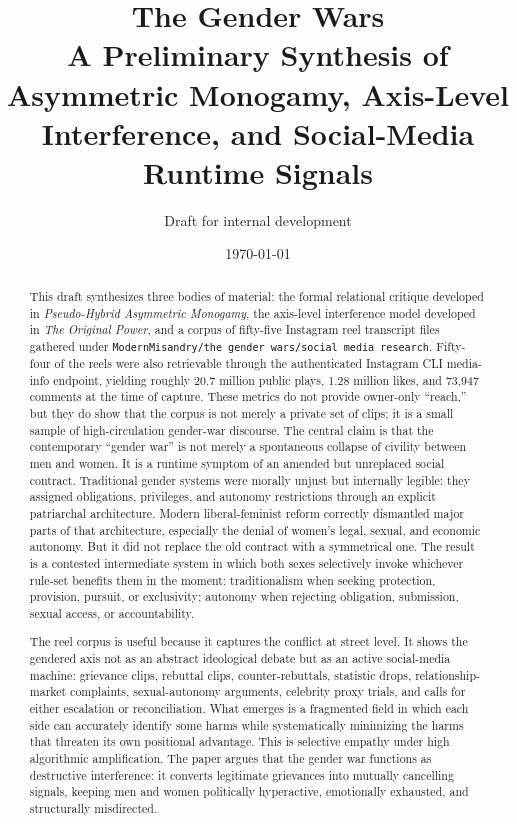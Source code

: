 \documentclass[12pt]{article}
\title{\textbf{The Gender Wars}\\
\large A Preliminary Synthesis of Asymmetric Monogamy, Axis-Level Interference, and Social-Media Runtime Signals}
\author{Draft for internal development}
\date{\today}
\newcommand{\OP}{\textit{The Original Power}}
\newcommand{\PHAM}{\textit{Pseudo-Hybrid Asymmetric Monogamy}}
\newcommand{\CorpusPath}{\texttt{ModernMisandry/the gender wars/social media research}}
\begin{document}
\maketitle

\begin{abstract}
This draft synthesizes three bodies of material: the formal relational critique developed in \PHAM, the axis-level interference model developed in \OP, and a corpus of fifty-five Instagram reel transcript files gathered under \CorpusPath. Fifty-four of the reels were also retrievable through the authenticated Instagram CLI media-info endpoint, yielding roughly 20.7 million public plays, 1.28 million likes, and 73,947 comments at the time of capture. These metrics do not provide owner-only ``reach,'' but they do show that the corpus is not merely a private set of clips; it is a small sample of high-circulation gender-war discourse. The central claim is that the contemporary ``gender war'' is not merely a spontaneous collapse of civility between men and women. It is a runtime symptom of an amended but unreplaced social contract. Traditional gender systems were morally unjust but internally legible: they assigned obligations, privileges, and autonomy restrictions through an explicit patriarchal architecture. Modern liberal-feminist reform correctly dismantled major parts of that architecture, especially the denial of women's legal, sexual, and economic autonomy. But it did not replace the old contract with a symmetrical one. The result is a contested intermediate system in which both sexes selectively invoke whichever rule-set benefits them in the moment: traditionalism when seeking protection, provision, pursuit, or exclusivity; autonomy when rejecting obligation, submission, sexual access, or accountability.

The reel corpus is useful because it captures the conflict at street level. It shows the gendered axis not as an abstract ideological debate but as an active social-media machine: grievance clips, rebuttal clips, counter-rebuttals, statistic drops, relationship-market complaints, sexual-autonomy arguments, celebrity proxy trials, and calls for either escalation or reconciliation. What emerges is a fragmented field in which each side can accurately identify some harms while systematically minimizing the harms that threaten its own positional advantage. This is selective empathy under high algorithmic amplification. The paper argues that the gender war functions as destructive interference: it converts legitimate grievances into mutually cancelling signals, keeping men and women politically hyperactive, emotionally exhausted, and structurally misdirected.
\end{abstract}
\end{document}
